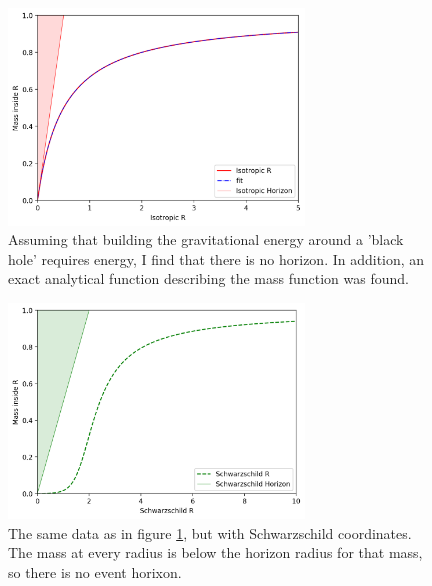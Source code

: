 \documentclass[../rzero]{subfiles}
\begin{document}
\begin{figure}
\includegraphics[width=0.70\textwidth]{chapters/images/no-horizons.png}
\caption{Assuming that building the gravitational energy around a 'black hole' requires energy, I find that there is no horizon. In addition, an exact analytical function describing the mass function was found. }
\label{isotropic-energy-hole}
\end{figure}

\begin{figure}
\includegraphics[width=0.70\textwidth]{chapters/images/no-horizons-s.png}
\caption{The same data as in figure \ref{isotropic-energy-hole}, but with Schwarzschild coordinates. The mass at every radius is below the horizon radius for that mass, so there is no event horixon.}
\label{isotropic-energy-hole-s}
\end{figure}
\end{document}
